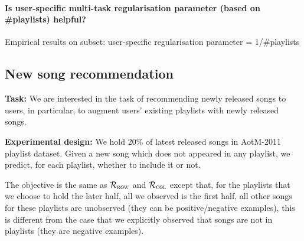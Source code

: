 \paragraph{Is user-specific multi-task regularisation parameter (based on \#playlists) helpful?}
Empirical results on subset: user-specific regularisation parameter = 1/\#playlists \\


\newpage


\subsection{New song recommendation}

{\bf Task:} 
We are interested in the task of recommending newly released songs to users,
in particular, to augment users' existing playlists with newly released songs.

{\bf Experimental design:} 
We hold 20\% of latest released songs in AotM-2011~\cite{mcfee2012hypergraph} playlist dataset.
Given a new song which does not appeared in any playlist, 
we predict, for each playlist, whether to include it or not.

The objective is the same as $\mathcal{R}_\textsc{row}$ and $\mathcal{R}_\textsc{col}$ except that,
for the playlists that we choose to hold the later half, all we observed is the first half, 
all other songs for these playlists are unobserved (they can be positive/negative examples),
this is different from the case that we explicitly observed that songs are not in playlists (they are negative examples).


